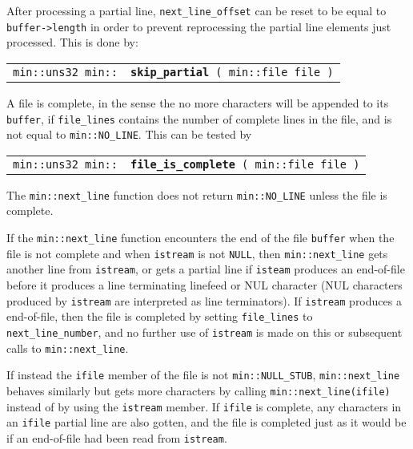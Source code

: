 \documentclass[12pt]{article}
\makeatletter
\newcommand{\ttindex}[1]{\index{#1@{\tt #1}}}
\newcommand{\minindex}[1]{\ttindex{min::#1}\ttindex{#1}}
\newcommand{\EOL}{\penalty \exhyphenpenalty}
\newenvironment{indpar}[1][0.3in]%
	{\begin{list}{}%
		     {\setlength{\itemsep}{0in}%
		      \setlength{\topsep}{0in}%
		      \setlength{\parsep}{1ex}%
		      \setlength{\labelwidth}{#1}%
		      \setlength{\leftmargin}{#1}%
		      \addtolength{\leftmargin}{\labelsep}}%
	 \item}%
	{\end{list}}
\newcommand{\LABEL}[1]{\label{#1}}
\newcommand{\MINKEY}[1]{{\tt \bf #1}\minindex{#1}}
\makeatother
\begin{document}
After processing a partial line, {\tt next\_\EOL line\_\EOL offset}
can be reset to be equal to {\tt buffer->\EOL length} in order to
prevent reprocessing the partial line elements just processed.
This is done by:

\begin{indpar}[1em]\begin{tabular}{r@{}l}
\verb|min::uns32 min::|
    & \MINKEY{skip\_\EOL partial}\verb| ( min::file file )|
\LABEL{MIN::SKIP_PARTIAL} \\
\end{tabular}\end{indpar}

A file is complete, in the sense the no more characters will be
appended to its {\tt buffer}, if {\tt file\_\EOL lines} contains
the number of complete lines in the file, and is not equal to
{\tt min::\EOL NO\_\EOL LINE}.  This can be tested by

\begin{indpar}[1em]\begin{tabular}{r@{}l}
\verb|min::uns32 min::|
    & \MINKEY{file\_\EOL is\_\EOL complete}\verb| ( min::file file )|
\LABEL{MIN::FILE_IS_COMPLETE} \\
\end{tabular}\end{indpar}

The {\tt min::\EOL next\_\EOL line} function does not return
{\tt min::\EOL NO\_\EOL LINE} unless the file is complete.

If the {\tt min::\EOL next\_\EOL line} function encounters the
end of the file {\tt buffer} when the file is not complete
and when {\tt istream} is not {\tt NULL},
then {\tt min::\EOL next\_\EOL line} gets another line from
{\tt istream}, or gets a partial line if {\tt isteam} produces
an end-of-file before it produces a line terminating linefeed
or NUL character (NUL characters produced by {\tt istream}
are interpreted as line terminators).  If {\tt istream} produces
a end-of-file, then the file is completed by setting
{\tt file\_\EOL lines} to {\tt next\_\EOL line\_\EOL number},
and no further use of {\tt istream} is made on this or subsequent calls to
{\tt min::\EOL next\_\EOL line}.

If instead the {\tt ifile} member of the file is not
{\tt min::\EOL NULL\_\EOL STUB}, 
{\tt min::\EOL next\_\EOL line} behaves similarly but gets
more characters by calling
{\tt min::\EOL next\_\EOL line(ifile)} instead of by using
the {\tt istream} member.  If {\tt ifile} is complete, any
characters in an {\tt ifile} partial line are also gotten, and the file
is completed just as it would be if an end-of-file had been read
from {\tt istream}.
\end{document}
